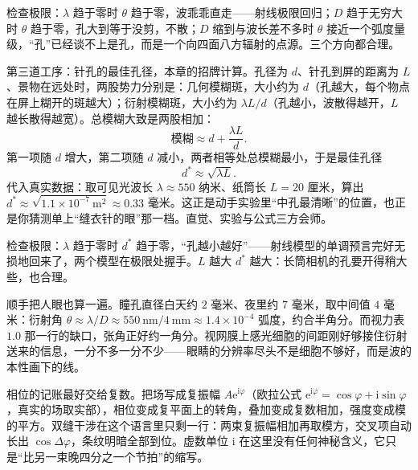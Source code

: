 检查极限：\(\lambda\) 趋于零时 \(\theta\) 趋于零，波乖乖直走——射线极限回归；\(D\) 趋于无穷大时 \(\theta\) 趋于零，孔大到等于没剪，不散；\(D\) 缩到与波长差不多时 \(\theta\) 接近一个弧度量级，“孔”已经谈不上是孔，而是一个向四面八方辐射的点源。三个方向都合理。

第三道工序：针孔的最佳孔径，本章的招牌计算。孔径为 \(d\)、针孔到屏的距离为 \(L\)、景物在远处时，两股势力分别是：几何模糊斑，大小约为 \(d\)（孔越大，每个物点在屏上糊开的斑越大）；衍射模糊斑，大小约为 \(\lambda L/d\)（孔越小，波散得越开，\(L\) 越长散得越宽）。总模糊大致是两股相加：
\[
  \text{模糊}\approx d+\frac{\lambda L}{d}.
\]
第一项随 \(d\) 增大，第二项随 \(d\) 减小，两者相等处总模糊最小，于是最佳孔径
\[
  d^{*}\approx\sqrt{\lambda L}.
\]
代入真实数据：取可见光波长 \(\lambda\approx 550\) 纳米、纸筒长 \(L=20\) 厘米，算出 \(d^{*}\approx\sqrt{1.1\times10^{-7}\ \mathrm{m}^2}\approx 0.33\) 毫米。这正是动手实验里“中孔最清晰”的位置，也正是你猜测单上“缝衣针的眼”那一档。直觉、实验与公式三方会师。

\begin{center}
\end{center}

检查极限：\(\lambda\) 趋于零时 \(d^{*}\) 趋于零，“孔越小越好”——射线模型的单调预言完好无损地回来了，两个模型在极限处握手。\(L\) 越大 \(d^{*}\) 越大：长筒相机的孔要开得稍大些，也合理。

顺手把人眼也算一遍。瞳孔直径白天约 \(2\) 毫米、夜里约 \(7\) 毫米，取中间值 \(4\) 毫米：衍射角 \(\theta\approx\lambda/D\approx 550\ \mathrm{nm}/4\ \mathrm{mm}\approx1.4\times10^{-4}\) 弧度，约合半角分。而视力表 \(1.0\) 那一行的缺口，张角正好约一角分。视网膜上感光细胞的间距刚好够接住衍射送来的信息，一分不多一分不少——眼睛的分辨率尽头不是细胞不够好，而是波的本性画下的线。

\begin{mathbridge}
相位的记账最好交给复数。把场写成复振幅 \(A\mathrm e^{\mathrm i\varphi}\)（欧拉公式 \(\mathrm e^{\mathrm i\varphi}=\cos\varphi+\mathrm i\sin\varphi\)，真实的场取实部），相位变成复平面上的转角，叠加变成复数相加，强度变成模的平方。双缝干涉在这个语言里只剩一行：两束复振幅相加再取模方，交叉项自动长出 \(\cos\Delta\varphi\)，条纹明暗全部到位。虚数单位 \(\mathrm i\) 在这里没有任何神秘含义，它只是“比另一束晚四分之一个节拍”的缩写。
\end{mathbridge}

